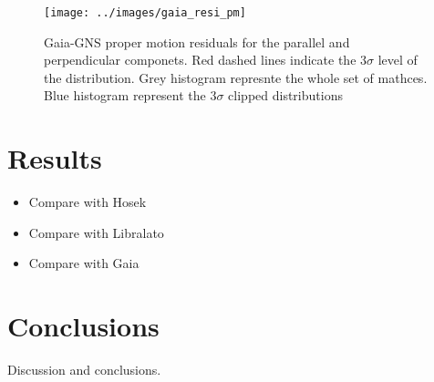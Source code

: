 \documentclass{aa} %
\begin{document}
	 \begin{figure}
	 	\centering
	 	\texttt{[image: ../images/gaia\_resi\_pm]}
	 	\caption{Gaia-GNS proper motion residuals for the parallel and perpendicular componets. Red dashed lines indicate the 3$\sigma$ level of the distribution. Grey histogram represnte the whole set of mathces. Blue histogram represent the 3$\sigma$ clipped distributions}
	 	\label{fig:gaiaresipm}
	 \end{figure}
	 
	

%	
	
	
	\section{Results}
  \begin{itemize}
  	\item Compare with Hosek
  	\item Compare with Libralato
  	\item Compare with Gaia
  \end{itemize}
	
	\section{Conclusions}
	Discussion and conclusions.
	
	
	
\end{document}

